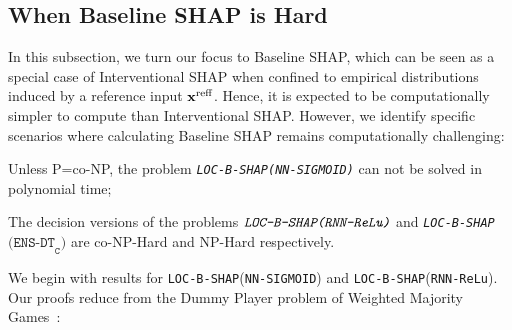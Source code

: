 \subsection{When Baseline SHAP is Hard} \label{subsec:baseline}
In this subsection, we turn our focus to Baseline SHAP, which can be seen as a special case of Interventional SHAP when confined to empirical distributions induced by a reference input $\textbf{x}^{\text{reff}}$. Hence, it is expected to be computationally simpler to compute than Interventional SHAP. However, we identify specific scenarios where calculating Baseline SHAP remains computationally challenging:
\begin{theorem} \label{thm:intractable} \begin{inparaenum}[(i)] \item Unless P=co-NP, the problem \texttt{\emph{LOC-B-SHAP}}\texttt{\emph{(NN-SIGMOID)}} can not be solved in polynomial time; \item The decision versions of the problems $\emph{\texttt{LOC-B-SHAP}\texttt{(RNN-ReLu)}}$ and \emph{\texttt{LOC-B-SHAP}$\texttt{(ENS-DT}_{\texttt{C}}\texttt{)}$} %
are co-NP-Hard and NP-Hard respectively.
    \end{inparaenum}
\end{theorem}


\begin{comment}
In the sequel, we shall provide the proof sketch of the reduction made to prove  the Hardness of the problems \texttt{LOC-B-SHAP}(\texttt{SIGMOID}). Due to space constraints and the similarities between the reduction strategies employed for \texttt{LOC-B-SHAP}(\texttt{SIGMOID}) and \texttt{LOC-B-SHAP}(\texttt{RNN-ReLu}), we won't discuss this latter in the main article.
\end{comment}

We begin with results for \texttt{LOC-B-SHAP}(\texttt{NN-SIGMOID}) and \texttt{LOC-B-SHAP}(\texttt{RNN-ReLu}). Our proofs reduce from the Dummy Player problem of Weighted Majority Games~\citep{freixas2011complexity}:  %

